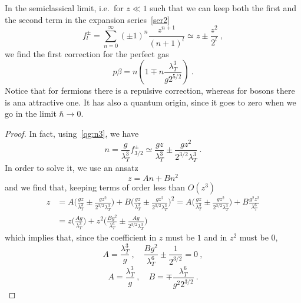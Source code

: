     In the semiclassical limit, i.e.~for $z \ll 1$ such that we can keep both the first and the second term in the expansion series~\eqref{ser2}  
    \begin{equation*}
        f_l^\pm = \sum_{n=0}^\infty (\pm 1)^n \frac{z^{n+1}}{(n+1)^l} \simeq z \pm \frac{z^2}{2^l} ~,
    \end{equation*}
    we find the first correction for the perfect gas 
    \begin{equation*}
        p \beta = n ( 1 \mp n \frac{\lambda_T^3}{g 2^{5/2}} ) ~.
    \end{equation*}
    Notice that for fermions there is a repulsive correction, whereas for bosons there is ana attractive one. It has also a quantum origin, since it goes to zero when we go in the limit $\hbar \rightarrow 0$.
    \begin{proof}
        In fact, using~\eqref{qg:n3}, we have 
        \begin{equation*}
            n = \frac{g}{\lambda_T^3} f^\pm_{3/2} \simeq \frac{gz}{\lambda_T^3} \pm \frac{g z^2}{2^{3/2} \lambda_T^3} ~.
        \end{equation*}
        In order to solve it, we use an ansatz 
        \begin{equation*}
            z = A n + B n^2 
        \end{equation*}
        and we find that, keeping terms of order less than $O(z^3)$
        \begin{equation*}
        \begin{aligned}
            z & = A \Big (\frac{gz}{\lambda_T^3} \pm \frac{g z^2}{2^{3/2} \lambda_T^3} \Big)+ B \Big (\frac{gz}{\lambda_T^3} \pm \frac{g z^2}{2^{3/2} \lambda_T^3} \Big)^2 = A \Big (\frac{gz}{\lambda_T^3} \pm \frac{g z^2}{2^{3/2} \lambda_T^3} \Big) + B \frac{g^2 z^2 }{\lambda_T^6} \\ & = z \Big (\frac{A g}{\lambda^3_T} \Big) + z^2 \Big (\frac{B g^2}{\lambda_T^6} \pm \frac{A g}{2^{3/2} \lambda_T^3} \Big )  
        \end{aligned}
        \end{equation*}
        which implies that, since the coefficient in $z$ must be $1$ and in $z^2$
        must be $0$,
        \begin{equation*}
            A = \frac{\lambda_T^3}{g} ~, \quad \frac{B g^2}{\lambda_T^6} \pm \frac{1}{2^{3/2}} = 0 ~,
        \end{equation*}
        \begin{equation*}
            A = \frac{\lambda_T^3}{g} ~, \quad B = \mp \frac{\lambda_T^6}{g^2 2^{3/2}} ~.

\end{equation*}
\end{proof}
